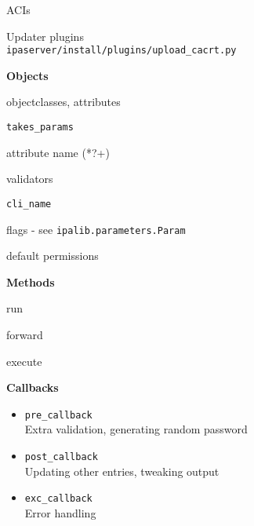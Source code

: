 \documentclass[20pt]{beamer}
\begin{document}
\begin{center}
{    \bigskip

    ACIs

    \bigskip

    Updater plugins
        \texttt{\\\tiny ipaserver/install/plugins/upload\_cacrt.py}
}



\begin{frame}[fragile]
    \textbf{Objects}
    \bigskip\bigskip

    objectclasses, attributes

    \verb+takes_params+

    attribute name (*?+)

    validators

    \verb+cli_name+

    flags - see \verb+ipalib.parameters.Param+

    default permissions
\end{frame}

\begin{frame}[fragile]
    \textbf{Methods}
    \bigskip\bigskip

    run

    forward

    execute
\end{frame}

\begin{frame}[fragile]
    \textbf{Callbacks}
    \bigskip\bigskip

    \tiny
    \begin{itemize}
    \item[]
    \verb+pre_callback+\\
    Extra validation, generating random password

    \item[]
    \verb+post_callback+\\
    Updating other entries, tweaking output

    \item[]
    \verb+exc_callback+\\
    Error handling


\end{itemize}
\end{frame}
\end{center}
\end{document}
